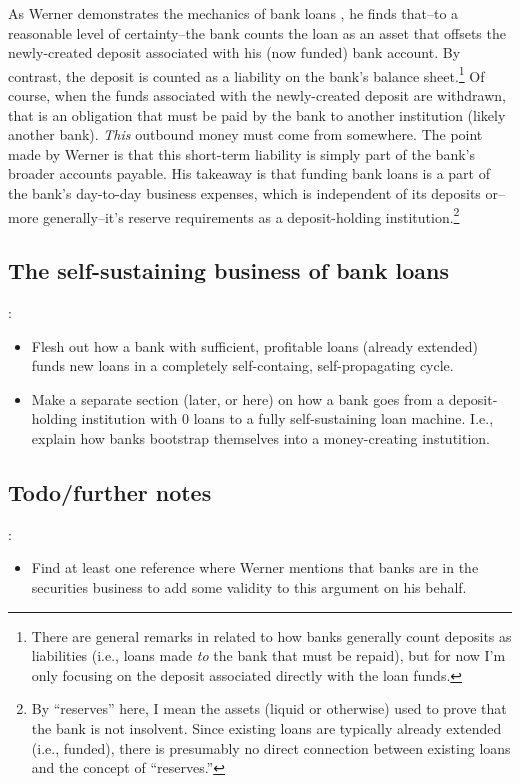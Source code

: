 As Werner demonstrates the mechanics of bank loans \cite{Werner2014}, he finds that--to a reasonable level of certainty--the bank counts the loan as an asset that offsets the newly-created deposit associated with his (now funded) bank account.  By contrast, the deposit is counted as a liability on the bank's balance sheet.\footnote{There are general remarks in \cite{Werner2014} related to how banks generally count deposits as liabilities (i.e., loans made {\it to} the bank that must be repaid), but for now I'm only focusing on the deposit associated directly with the loan funds.}  Of course, when the funds associated with the newly-created deposit are withdrawn, that is an obligation that must be paid by the bank to another institution (likely another bank).  {\it This} outbound money must come from somewhere.  The point made by Werner \cite{Werner2014} is that this short-term liability is simply part of the bank's broader accounts payable.  His takeaway is that funding bank loans is a part of the bank's day-to-day business expenses, which is independent of its deposits or--more generally--it's reserve requirements as a deposit-holding institution.\footnote{By ``reserves'' here, I mean the assets (liquid or otherwise) used to prove that the bank is not insolvent.  Since existing loans are typically already extended (i.e., funded), there is presumably no direct connection between existing loans and the concept of ``reserves.''}

\subsection{The self-sustaining business of bank loans}

\note{[Todo]}:
\begin{itemize}
    \item Flesh out how a bank with sufficient, profitable loans (already extended) funds new loans in a completely self-containg, self-propagating cycle.
    \item Make a separate section (later, or here) on how a bank goes from a deposit-holding institution with 0 loans to a fully self-sustaining loan machine.  I.e., explain how banks bootstrap themselves into a money-creating instutition.
\end{itemize}



\subsection{Todo/further notes}
\note{[Todo]}:
\begin{itemize}
    \item Find at least one reference where Werner mentions that banks are in the securities business to add some validity to this argument on his behalf.
\end{itemize}